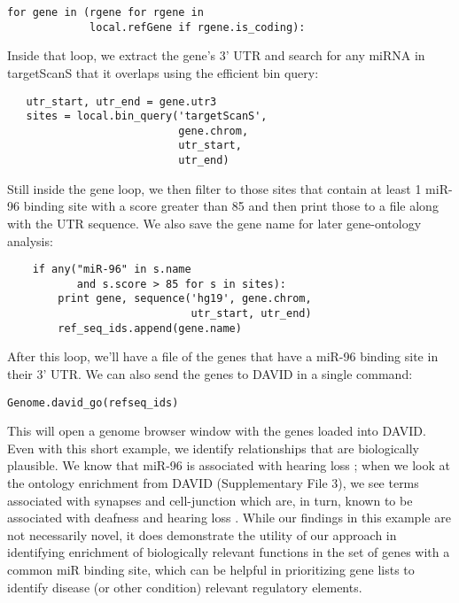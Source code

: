 \documentclass{bioinfo}
\begin{document}
\begin{verbatim}
for gene in (rgene for rgene in
             local.refGene if rgene.is_coding):
\end{verbatim}

Inside that loop, we extract the gene’s 3’ UTR and search for any miRNA in targetScanS that it overlaps using the efficient bin query:

\begin{verbatim}
   utr_start, utr_end = gene.utr3
   sites = local.bin_query('targetScanS',
                           gene.chrom,
                           utr_start,
                           utr_end)
\end{verbatim}

Still inside the gene loop, we then filter to those sites that contain at least 1 miR-96 binding site with a score greater than 85 and then print those to a file along with the UTR sequence. We also save the gene name for later gene-ontology analysis:

\begin{verbatim}
    if any("miR-96" in s.name 
           and s.score > 85 for s in sites):
        print gene, sequence('hg19', gene.chrom,
                             utr_start, utr_end)
        ref_seq_ids.append(gene.name)
\end{verbatim}

After this loop, we’ll have a file of the genes that have a miR-96 binding site in their 3’ UTR. We can also send the genes to DAVID \citep{Huang} in a single command:

\begin{verbatim}
Genome.david_go(refseq_ids)
\end{verbatim}

This will open a genome browser window with the genes loaded into DAVID. Even with this short example, we identify relationships that are biologically plausible. We know that miR-96 is associated with hearing loss \citep{Mencia}; when we look at the ontology enrichment from DAVID (Supplementary File 3), we see terms associated with synapses and cell-junction which are, in turn, known to be associated with deafness and hearing loss \citep{Martinez}. While our findings in this example are not necessarily novel, it does demonstrate the utility of our approach in identifying enrichment of biologically relevant functions in the set of genes with a common miR binding site, which can be helpful in prioritizing gene lists to identify disease (or other condition) relevant regulatory elements.
\end{document}
